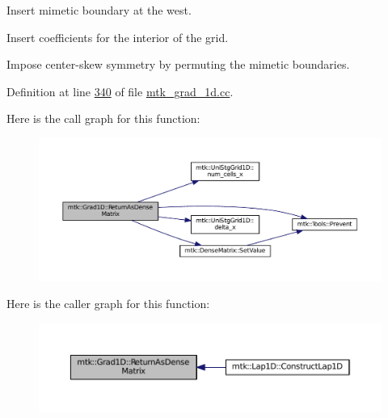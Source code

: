 \begin{DoxyEnumerate}
\item Insert mimetic boundary at the west.
\item Insert coefficients for the interior of the grid.
\item Impose center-\/skew symmetry by permuting the mimetic boundaries. 
\end{DoxyEnumerate}

Definition at line \hyperlink{mtk__grad__1d_8cc_source_l00340}{340} of file \hyperlink{mtk__grad__1d_8cc_source}{mtk\-\_\-grad\-\_\-1d.\-cc}.



Here is the call graph for this function\-:\nopagebreak
\begin{figure}[H]
\begin{center}
\leavevmode
\includegraphics[width=350pt]{classmtk_1_1Grad1D_a75781c4455569a7934d4e0dff7e06064_cgraph}
\end{center}
\end{figure}




Here is the caller graph for this function\-:\nopagebreak
\begin{figure}[H]
\begin{center}
\leavevmode
\includegraphics[width=350pt]{classmtk_1_1Grad1D_a75781c4455569a7934d4e0dff7e06064_icgraph}
\end{center}
\end{figure}


